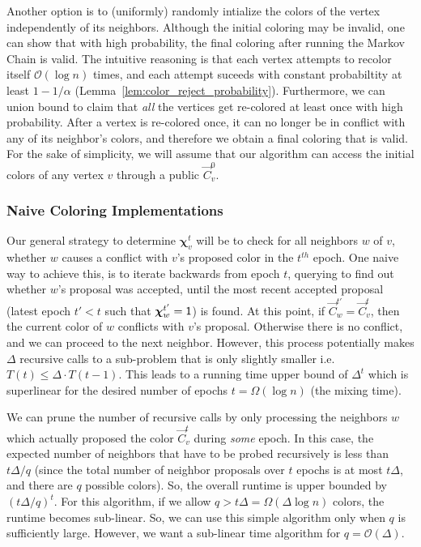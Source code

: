 Another option is to (uniformly) randomly intialize the colors of the vertex independently of its neighbors.
Although the initial coloring may be invalid, one can show that with high probability, the final coloring after running the Markov Chain is valid.
The intuitive reasoning is that each vertex attempts to recolor itself $\mathcal O(\log n)$ times,
and each attempt suceeds with constant probabiltity at least $1 - 1/\alpha$ (Lemma~\ref{lem:color_reject_probability}).
Furthermore, we can union bound to claim that \emph{all} the vertices get re-colored at least once with high probability.
After a vertex is re-colored once, it can no longer be in conflict with any of its neighbor's colors,
and therefore we obtain a final coloring that is valid.
For the sake of simplicity, we will assume that our algorithm can access the initial colors of any vertex $v$ through a public $\vec C^0_v$.

\subsubsection{Naive Coloring Implementations}%
\label{sec:naive_coloring_implementations}
Our general strategy to determine $\bm\chi^t_v$ will be to check for all neighbors $w$ of $v$,
whether $w$ causes a conflict with $v$'s proposed color in the $t^{th}$ epoch.
One naive way to achieve this, is to iterate backwards from epoch $t$, querying to find out whether $w$'s proposal was accepted,
until the most recent accepted proposal (latest epoch $t' < t$ such that $\bm\chi^{t'}_w=\mathsf{1}$) is found.
At this point, if $\vec C^{t'}_w =\vec C^t_v$, then the current color of $w$ conflicts with $v$'s proposal.
Otherwise there is no conflict, and we can proceed to the next neighbor.
However, this process potentially makes $\Delta$ recursive calls to a sub-problem that is only slightly smaller i.e. $T(t) \le \Delta\cdot T(t-1)$.
This leads to a running time upper bound of $\Delta^{t}$ which is superlinear for the desired number of epochs $t = \Omega(\log n)$ (the mixing time).

We can prune the number of recursive calls by only processing the neighbors $w$ which actually proposed the color $\vec C^t_v$ during \emph{some} epoch.
In this case, the expected number of neighbors that have to be probed recursively is less than $t\Delta/q$
(since the total number of neighbor proposals over $t$ epochs is at most $t\Delta$, and there are $q$ possible colors).
So, the overall runtime is upper bounded by $(t\Delta/q)^{t}$.
For this algorithm, if we allow $q > t\Delta = \Omega(\Delta\log n)$ colors, the runtime becomes sub-linear.
So, we can use this simple algorithm only when $q$ is sufficiently large.
However, we want a sub-linear time algorithm for $q = \mathcal O(\Delta)$.


